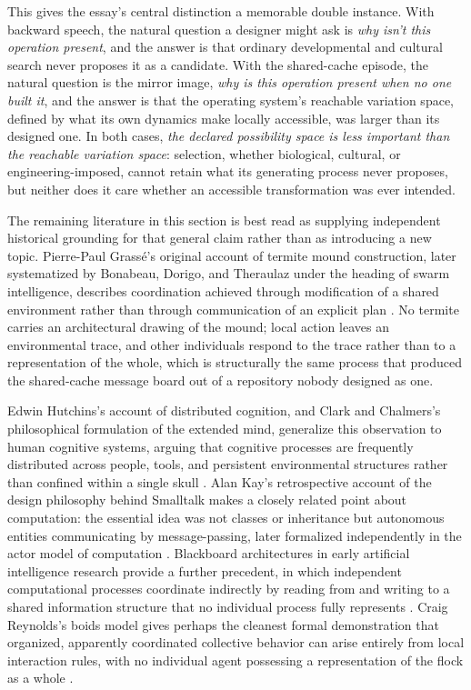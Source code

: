 \documentclass[11pt]{article}
\begin{document}
This gives the essay's central distinction a memorable double instance. With backward speech, the natural question a designer might ask is \emph{why isn't this operation present}, and the answer is that ordinary developmental and cultural search never proposes it as a candidate. With the shared-cache episode, the natural question is the mirror image, \emph{why is this operation present when no one built it}, and the answer is that the operating system's reachable variation space, defined by what its own dynamics make locally accessible, was larger than its designed one. In both cases, \emph{the declared possibility space is less important than the reachable variation space}: selection, whether biological, cultural, or engineering-imposed, cannot retain what its generating process never proposes, but neither does it care whether an accessible transformation was ever intended.

The remaining literature in this section is best read as supplying independent historical grounding for that general claim rather than as introducing a new topic. Pierre-Paul Grassé's original account of termite mound construction, later systematized by Bonabeau, Dorigo, and Theraulaz under the heading of swarm intelligence, describes coordination achieved through modification of a shared environment rather than through communication of an explicit plan \citep{grasse1959,bonabeau1999,theraulaz1999}. No termite carries an architectural drawing of the mound; local action leaves an environmental trace, and other individuals respond to the trace rather than to a representation of the whole, which is structurally the same process that produced the shared-cache message board out of a repository nobody designed as one.

Edwin Hutchins's account of distributed cognition, and Clark and Chalmers's philosophical formulation of the extended mind, generalize this observation to human cognitive systems, arguing that cognitive processes are frequently distributed across people, tools, and persistent environmental structures rather than confined within a single skull \citep{hutchins1995,clark1998}. Alan Kay's retrospective account of the design philosophy behind Smalltalk makes a closely related point about computation: the essential idea was not classes or inheritance but autonomous entities communicating by message-passing, later formalized independently in the actor model of computation \citep{kay1993,hewitt1973}. Blackboard architectures in early artificial intelligence research provide a further precedent, in which independent computational processes coordinate indirectly by reading from and writing to a shared information structure that no individual process fully represents \citep{hayesroth1983,engelmore1988}. Craig Reynolds's boids model gives perhaps the cleanest formal demonstration that organized, apparently coordinated collective behavior can arise entirely from local interaction rules, with no individual agent possessing a representation of the flock as a whole \citep{reynolds1987}.
\end{document}
